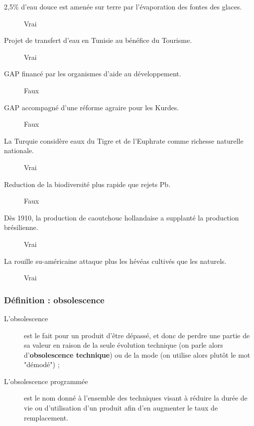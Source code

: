 \begin{description}
	\item [2,5\% d'eau douce est amenée sur terre par l'évaporation des fontes des glaces. ]
	\color{cyan}Vrai\color{black}

	\item [Projet de transfert d'eau en Tunisie au bénéfice du Tourisme. ]
	\color{cyan}Vrai\color{black}

	\item [GAP financé par les organismes d'aide au développement. ]
	\color{cyan}Faux\color{black}

	\item [GAP accompagné d'une réforme agraire pour les Kurdes. ]
	\color{cyan}Faux\color{black}

	\item [La Turquie considère eaux du Tigre et de l'Euphrate comme richesse naturelle nationale. ]
	\color{cyan}Vrai\color{black}

	\item [Reduction de la biodiversité plus rapide que rejets Pb. ]
	\color{cyan}Faux\color{black}

	\item [Dès 1910, la production de caoutchouc hollandaise a supplanté la production brésilienne. ]
	\color{cyan}Vrai\color{black}

	\item [La rouille su-américaine attaque plus les hévéas cultivés que les naturels. ]
	\color{cyan}Vrai\color{black}
\end{description}



\subsubsection{Définition : obsolescence}
\color{cyan}
\begin{description}
	\item [L'obsolescence] est le fait pour un produit d’être dépassé, et donc de perdre une partie de sa valeur en raison de la seule évolution technique (on parle alors d'\textbf{obsolescence technique}) ou de la mode (on utilise alors plutôt le mot "démodé") ;
	\item [L’obsolescence programmée] est le nom donné à l'ensemble des techniques visant à réduire la durée de vie ou d'utilisation d'un produit afin d'en augmenter le taux de remplacement.\color{black}
\end{description}
\color{black}




